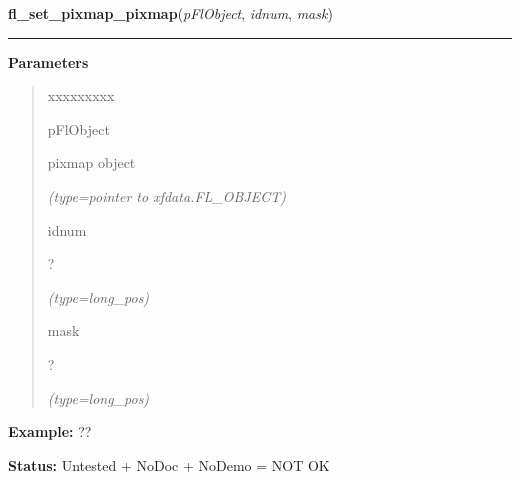     \vspace{0.5ex}

\hspace{.8\funcindent}\begin{boxedminipage}{\funcwidth}

    \raggedright \textbf{fl\_set\_pixmap\_pixmap}(\textit{pFlObject}, \textit{idnum}, \textit{mask})

    \vspace{-1.5ex}

    \rule{\textwidth}{0.5\fboxrule}
\setlength{\parskip}{2ex}
\setlength{\parskip}{1ex}
      \textbf{Parameters}
      \vspace{-1ex}

      \begin{quote}
        \begin{Ventry}{xxxxxxxxx}

          \item[pFlObject]

          pixmap object

            {\it (type=pointer to xfdata.FL\_OBJECT)}

          \item[idnum]

          ?

            {\it (type=long\_pos)}

          \item[mask]

          ?

            {\it (type=long\_pos)}

        \end{Ventry}

      \end{quote}

\textbf{Example:} ??



\textbf{Status:} Untested + NoDoc + NoDemo = NOT OK



    \end{boxedminipage}

    \label{xformslib:flbitmap:fl_set_pixmap_pixmap}

    \vspace{0.5ex}

